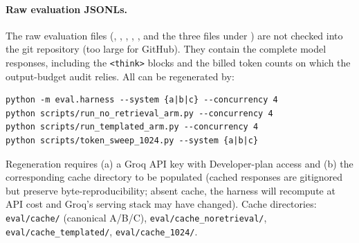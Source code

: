 \paragraph{Raw evaluation JSONLs.}
The raw evaluation files (,
, ,
,
, and the three files under
) are not checked into the git repository (too large for GitHub).
They contain the complete model responses, including the \texttt{<think>} blocks and the
billed token counts on which the output-budget audit relies.  All can be regenerated by:
\begin{verbatim}
python -m eval.harness --system {a|b|c} --concurrency 4
python scripts/run_no_retrieval_arm.py --concurrency 4
python scripts/run_templated_arm.py --concurrency 4
python scripts/token_sweep_1024.py --system {a|b|c}
\end{verbatim}
\noindent Regeneration requires (a) a Groq API key with Developer-plan access
and (b) the corresponding cache directory to be populated (cached responses are
gitignored but preserve byte-reproducibility; absent cache, the harness will
recompute at API cost and Groq's serving stack may have changed).  Cache directories:
\texttt{eval/cache/} (canonical A/B/C), \texttt{eval/cache\_noretrieval/},
\texttt{eval/cache\_templated/}, \texttt{eval/cache\_1024/}.

